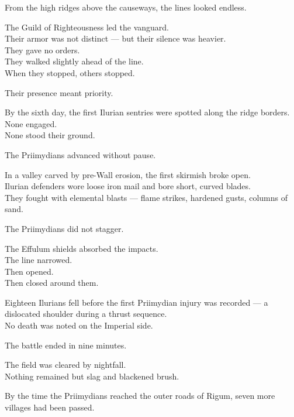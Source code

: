 \documentclass[12pt]{article}
\begin{document}
From the high ridges above the causeways, the lines looked endless.

\vspace{1em}

The Guild of Righteousness led the vanguard.\\
Their armor was not distinct — but their silence was heavier.\\
They gave no orders.\\
They walked slightly ahead of the line.\\
When they stopped, others stopped.

Their presence meant priority.

\vspace{1em}

By the sixth day, the first Ilurian sentries were spotted along the ridge borders.\\
None engaged.\\
None stood their ground.

The Priimydians advanced without pause.

\vspace{1em}

In a valley carved by pre-Wall erosion, the first skirmish broke open.\\
Ilurian defenders wore loose iron mail and bore short, curved blades.\\
They fought with elemental blasts — flame strikes, hardened gusts, columns of sand.

The Priimydians did not stagger.

The Effulum shields absorbed the impacts.\\
The line narrowed.\\
Then opened.\\
Then closed around them.

Eighteen Ilurians fell before the first Priimydian injury was recorded — a dislocated shoulder during a thrust sequence.\\
No death was noted on the Imperial side.

\vspace{1em}

The battle ended in nine minutes.

The field was cleared by nightfall.\\
Nothing remained but slag and blackened brush.

\vspace{1em}

By the time the Priimydians reached the outer roads of Rigum, seven more villages had been passed.
\end{document}

